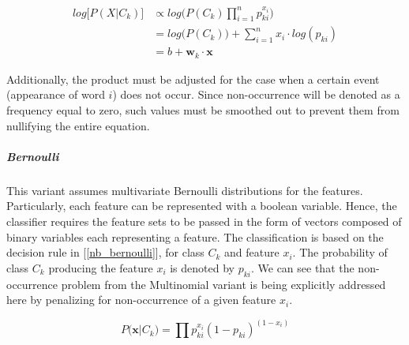 	\begin{equation}
		\begin{aligned}
			log \big[ P(X|C_k) \big] &\propto log \bigg( P(C_k)\prod_{i=1}^n p_{ki}^{x_i} \bigg) \\
			&= log \bigg(P(C_k) \bigg) + \sum_{i=1}^n x_i \cdot log(p_{ki}) \\
			&= b + \textbf{w}_k \cdot \textbf{x} 
		\end{aligned}
		\label{nb_multinom_log}
	\end{equation}
		
		Additionally, the product must be adjusted for the case when a certain event (appearance of word $ i $) does not occur. Since non-occurrence will be denoted as a frequency equal to zero, such values must be smoothed out to prevent them from nullifying the entire equation.
	
	\subparagraph{Bernoulli}
		This variant assumes multivariate Bernoulli distributions for the features. Particularly, each feature can be represented with a boolean variable. Hence, the classifier requires the feature sets to be passed in the form of vectors composed of binary variables each representing a feature. The classification is based on the decision rule in [\ref{nb_bernoulli}], for class $ C_k $ and feature $ x_i $. The probability of class $ C_k $ producing the feature $ x_i $ is denoted by $ p_{ki} $. We can see that the non-occurrence problem from the Multinomial variant is being explicitly addressed here by penalizing for non-occurrence of a given feature $ x_i $.
	
	\begin{equation}
		P \big(\textbf{x}|C_k \big) = \prod p_{ki}^{x_i}(1-p_{ki})^{(1-x_i)}
		\label{nb_bernoulli}
	\end{equation}